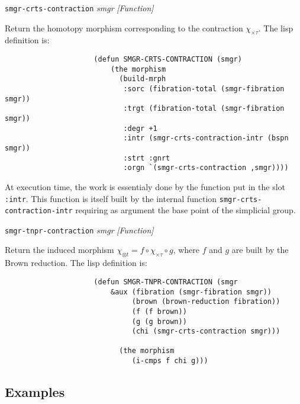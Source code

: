 {\parindent=0mm
{\leftskip=5mm
{\tt smgr-crts-contraction} {\em smgr} \hfill {\em [Function]} \par}
{\leftskip=15mm
Return the homotopy morphism corresponding to the contraction
$\chi_{\times\tau}$. The lisp definition is:
{\footnotesize\begin{verbatim}
                     (defun SMGR-CRTS-CONTRACTION (smgr)
                         (the morphism
                           (build-mrph
                            :sorc (fibration-total (smgr-fibration smgr))
                            :trgt (fibration-total (smgr-fibration smgr))
                            :degr +1
                            :intr (smgr-crts-contraction-intr (bspn smgr))
                            :strt :gnrt
                            :orgn `(smgr-crts-contraction ,smgr))))
\end{verbatim}}
At execution time, the work is essentialy done by the function put in the
slot {\tt :intr}. This function is itself built by the internal function {\tt smgr-crts-contraction-intr}
requiring as argument the base point of the  simplicial group. \par}
{\leftskip=5mm
{\tt smgr-tnpr-contraction} {\em smgr} \hfill {\em [Function]} \par}
{\leftskip=15mm
Return the induced morphism $\chi_{\otimes t}= f \circ \chi_{\times\tau} \circ g$,
where $f$ and $g$ are built by the Brown reduction.
The lisp definition is:
{\footnotesize\begin{verbatim}
                     (defun SMGR-TNPR-CONTRACTION (smgr
                         &aux (fibration (smgr-fibration smgr))
                              (brown (brown-reduction fibration))
                              (f (f brown))
                              (g (g brown))
                              (chi (smgr-crts-contraction smgr)))

                           (the morphism
                              (i-cmps f chi g)))
\end{verbatim}} \par}
}

\subsection* {Examples}

